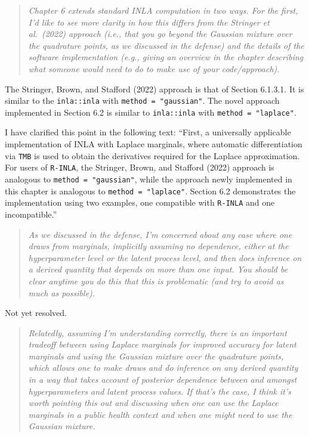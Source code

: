 \documentclass[
  12pt,
]{article}
\begin{document}
\begin{quote}
\emph{Chapter 6 extends standard INLA computation in two ways. For the
first, I'd like to see more clarity in how this differs from the
Stringer et al.~(2022) approach (i.e., that you go beyond the Gaussian
mixture over the quadrature points, as we discussed in the defense) and
the details of the software implementation (e.g., giving an overview in
the chapter describing what someone would need to do to make use of your
code/approach).}
\end{quote}

The Stringer, Brown, and Stafford (2022) approach is that of Section
6.1.3.1. It is similar to the \texttt{inla::inla} with
\texttt{method\ =\ "gaussian"}. The novel approach implemented in
Section 6.2 is similar to \texttt{inla::inla} with
\texttt{method\ =\ "laplace"}.

I have clarified this point in the following text: ``First, a
universally applicable implementation of INLA with Laplace marginals,
where automatic differentiation via \texttt{TMB} is used to obtain the
derivatives required for the Laplace approximation. For users of
\texttt{R-INLA}, the Stringer, Brown, and Stafford (2022) approach is
analogous to \texttt{method\ =\ "gaussian"}, while the approach newly
implemented in this chapter is analogous to
\texttt{method\ =\ "laplace"}. Section 6.2 demonstrates the
implementation using two examples, one compatible with \texttt{R-INLA}
and one incompatible.''

\begin{quote}
\emph{As we discussed in the defense, I'm concerned about any case where
one draws from marginals, implicitly assuming no dependence, either at
the hyperparameter level or the latent process level, and then does
inference on a derived quantity that depends on more than one input. You
should be clear anytime you do this that this is problematic (and try to
avoid as much as possible).}
\end{quote}

Not yet resolved.

\begin{quote}
\emph{Relatedly, assuming I'm understanding correctly, there is an
important tradeoff between using Laplace marginals for improved accuracy
for latent marginals and using the Gaussian mixture over the quadrature
points, which allows one to make draws and do inference on any derived
quantity in a way that takes account of posterior dependence between and
amongst hyperparameters and latent process values. If that's the case, I
think it's worth pointing this out and discussing when one can use the
Laplace marginals in a public health context and when one might need to
use the Gaussian mixture.}
\end{quote}
\end{document}

